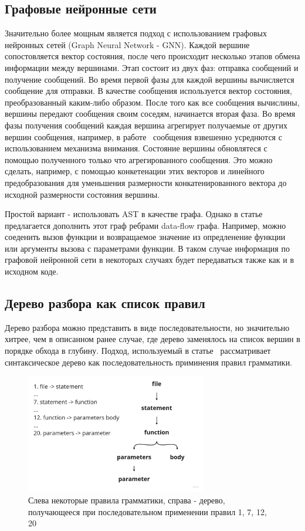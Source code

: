 \documentclass[times,specification,annotation]{itmo-student-thesis}
\begin{document}
\subsection{Графовые нейронные сети}\label{sec:gnn}
Значительно более мощным является подход с использованием графовых нейронных сетей (Graph Neural Network - GNN). Каждой вершине сопостовляется вектор состояния, после чего происходит несколько этапов обмена информации между вершинами. Этап состоит из двух фаз: отправка сообщений и получение сообщений. Во время первой фазы для каждой вершины вычисляется сообщение для отправки. В качестве сообщения используется вектор состояния, преобразованный каким-либо образом. После того как все сообщения вычислины, вершины передают сообщения своим соседям, начинается вторая фаза. Во время фазы получения сообщений каждая вершина агрегирует получаемые от других вершин сообщения, например, в работе~\cite{graph-attention-networks} сообщения взвешенно усреднются с использованием механизма внимания. Состояние вершины обновлятеся с помощью полученного только что агрегированного сообщения. Это можно сделать, например, с помощью конкетенации этих векторов и линейного предобразования для уменьшения размерности конкатенированного вектора до исходной размерности состояния вершины.

Простой вариант - использовать AST в качестве графа. Однако в статье~\cite{gated-graphs-nn} предлагается дополнить этот граф ребрами data-flow графа. Например, можно соеденить вызов функции и возвращаемое значение из опредленение функции или аргументы вызова с параметрами функции. В таком случае информация по графовой нейронной сети в некоторых случаях будет передаваться также как и в исходном коде.

\subsection{Дерево разбора как список правил}\label{sec:treegen}
Дерево разбора можно представить в виде последовательности, но значительно хитрее, чем в описанном ранее случае, где дерево заменялось на список вершин в порядке обхода в глубину. Подход, используемый в статье~\cite{tree-gen} рассматривает синтаксическое дерево как последовательность приминения правил грамматики.

\begin{figure}[!h]
    \caption{Слева некоторые правила грамматики, справа - дерево, получающееся при последовательном применении правил 1, 7, 12, 20}\label{treegen}
    \centering
    \includegraphics[width=0.7\textwidth]{treegen.jpg}
\end{figure}
\end{document}
